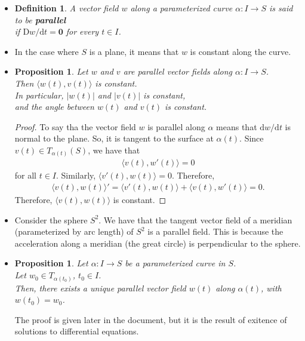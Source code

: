 \documentclass[10pt]{article}
\newtheorem{definition}[lemma]{Definition}
\newtheorem{proposition}[lemma]{Proposition}
\newcommand{\dee}{\mathrm{d}}
\newcommand{\Dee}{\mathrm{D}}
\newcommand{\ve}[1]{\mathbf{#1}}
\newcommand{\ra}{\rightarrow}
\begin{document}
  \begin{itemize}
    \item \begin{definition}
      A vector field $w$ along a parameterized curve $\alpha : I \ra S$ is said to be {\bf parallel}\\
      if $\Dee w/ \dee t = \ve{0}$ for every $t \in I$.    
    \end{definition}    

    \item In the case where $S$ is a plane, it means that $w$ is constant along the curve.

    \item \begin{proposition} \label{parallel-vector-field-preserves-dot-product}
      Let $w$ and $v$ are parallel vector fields along $\alpha : I \ra S$.\\
      Then $\langle w(t), v(t) \rangle$ is constant.\\
      In particular, $|w(t)|$ and $|v(t)|$ is constant,\\
      and the angle between $w(t)$ and $v(t)$ is constant.
    \end{proposition}
    \begin{proof}
      To say tha the vector field $w$ is parallel along $\alpha$ means that $\dee w / \dee t$ is normal to the plane. So, it is tangent to the surface at $\alpha(t)$. Since $v(t) \in T_{\alpha(t)}(S)$, we have that
      \begin{align*}
        \langle v(t), w'(t) \rangle = 0
      \end{align*}
      for all $t \in I$. Similarly, $\langle v'(t), w(t) \rangle = 0$. Therefore,
      \begin{align*}
        \langle v(t), w(t) \rangle' = \langle v'(t), w(t) \rangle + \langle v(t), w'(t) \rangle = 0.
      \end{align*}
      Therefore, $\langle v(t), w(t) \rangle$ is constant.
    \end{proof}

    \item Consider the sphere $S^2$. We have that the tangent vector field of a meridian (parameterized by arc length) of $S^2$ is a parallel field. This is because the acceleration along a meridian (the great circle) is perpendicular to the sphere.

    \item \begin{proposition} \label{existence-of-parallel-field}
      Let $\alpha : I \ra S$ be a parameterized curve in $S$.\\
      Let $w_0 \in T_{\alpha(t_0)}$, $t_0 \in I$.\\
      Then, there exists a unique parallel vector field $w(t)$ along $\alpha(t)$, with $w(t_0) = w_0$.
    \end{proposition}
    The proof is given later in the document, but it is the result of exitence of solutions to differential equations.    
  \end{itemize}
\end{document}
